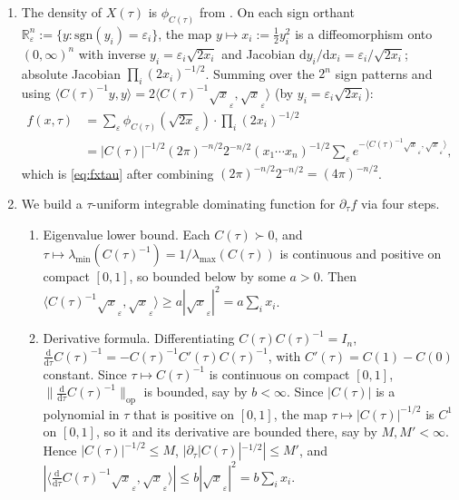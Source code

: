 \documentclass[12pt,a4paper]{article}
\makeatletter
\theoremstyle{definition}
\renewenvironment{proof}[1][\proofname]{\par
  \pushQED{\qed}%
  \normalfont \topsep6\p@\@plus6\p@\relax
  \trivlist
  \item[\hskip\labelsep\bfseries #1\@addpunct{.}]\ignorespaces
}{%
  \popQED\endtrivlist\@endpefalse
}
\newcommand{\R}{\mathbb{R}}
\newcommand{\dd}{\mathrm{d}}
\makeatother
\begin{document}
\begin{proof}
  \leavevmode
  \begin{enumerate}[label=(\roman*)]
    \item The density of $X(\tau)$ is $\phi_{C(\tau)}$ from
      .  On each sign orthant
      $\R^n_\varepsilon:=\{y:\text{sgn}(y_i)=\varepsilon_i\}$, the map
      $y\mapsto x_i:=\tfrac12 y_i^2$ is a diffeomorphism onto
      $(0,\infty)^n$ with inverse $y_i=\varepsilon_i\sqrt{2x_i}$ and
      Jacobian $\dd y_i/\dd x_i=\varepsilon_i/\sqrt{2x_i}$; absolute
      Jacobian $\prod_i(2x_i)^{-1/2}$.  Summing over the $2^n$ sign
      patterns and using
      $\langle C(\tau)^{-1}y,y\rangle
      =2\langle C(\tau)^{-1}\sqrt{x}_\varepsilon,\sqrt{x}_\varepsilon\rangle$
      (by $y_i=\varepsilon_i\sqrt{2x_i}$):
      \begin{align*}
        f(x,\tau)
        &=\sum_\varepsilon\phi_{C(\tau)}(\sqrt{2x}_\varepsilon)
          \cdot\prod_i(2x_i)^{-1/2}\\
        &=|C(\tau)|^{-1/2}(2\pi)^{-n/2}2^{-n/2}(x_1\cdots x_n)^{-1/2}
          \sum_\varepsilon e^{-\langle C(\tau)^{-1}\sqrt{x}_\varepsilon,
          \sqrt{x}_\varepsilon\rangle},
      \end{align*}
      which is \eqref{eq:fxtau} after combining $(2\pi)^{-n/2}2^{-n/2}=(4\pi)^{-n/2}$.

    \item We build a $\tau$-uniform integrable dominating function for
      $\partial_\tau f$ via four steps.
      \begin{enumerate}
        \item Eigenvalue lower bound.  Each $C(\tau)\succ 0$, and
          $\tau\mapsto\lambda_{\min}(C(\tau)^{-1})=1/\lambda_{\max}(C(\tau))$
          is continuous and positive on compact $[0,1]$, so bounded
          below by some $a>0$.  Then
          $\langle C(\tau)^{-1}\sqrt{x}_\varepsilon,\sqrt{x}_\varepsilon\rangle
          \geqslant a|\sqrt{x}_\varepsilon|^2=a\sum_ix_i$.

        \item Derivative formula.  Differentiating
          $C(\tau)C(\tau)^{-1}=I_n$,
          $\tfrac{\dd}{\dd\tau}C(\tau)^{-1}=-C(\tau)^{-1}C'(\tau)C(\tau)^{-1}$,
          with $C'(\tau)=C(1)-C(0)$ constant.  Since
          $\tau\mapsto C(\tau)^{-1}$ is continuous on compact $[0,1]$,
          $\|\tfrac{\dd}{\dd\tau}C(\tau)^{-1}\|_{\mathrm{op}}$ is
          bounded, say by $b<\infty$.  Since $|C(\tau)|$ is a polynomial
          in $\tau$ that is positive on $[0,1]$, the map
          $\tau\mapsto|C(\tau)|^{-1/2}$ is $C^1$ on $[0,1]$, so it and
          its derivative are bounded there, say by $M,M'<\infty$.  Hence
          $|C(\tau)|^{-1/2}\leqslant M$,
          $|\partial_\tau|C(\tau)|^{-1/2}|\leqslant M'$, and
          $|\langle\tfrac{\dd}{\dd\tau}C(\tau)^{-1}\sqrt{x}_\varepsilon,
          \sqrt{x}_\varepsilon\rangle|\leqslant b|\sqrt{x}_\varepsilon|^2
          =b\sum_ix_i$.


\end{enumerate}
\end{enumerate}
\end{proof}
\end{document}
